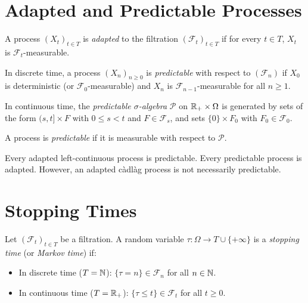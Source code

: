 \section{Adapted and Predictable Processes}

\begin{definition}
A process $(X_t)_{t \in T}$ is \emph{adapted} to the filtration
$(\mathcal{F}_t)_{t \in T}$ if for every $t \in T$, $X_t$ is
$\mathcal{F}_t$-measurable.
\end{definition}

\begin{definition}
In discrete time, a process $(X_n)_{n \geq 0}$ is \emph{predictable} with respect
to $(\mathcal{F}_n)$ if $X_0$ is deterministic (or $\mathcal{F}_0$-measurable)
and $X_n$ is $\mathcal{F}_{n-1}$-measurable for all $n \geq 1$.
\end{definition}

\begin{definition}
\label{def:predictable_sigma}
In continuous time, the \emph{predictable $\sigma$-algebra} $\mathcal{P}$ on
$\mathbb{R}_+ \times \Omega$ is generated by sets of the form $(s, t] \times F$ with
$0 \leq s < t$ and $F \in \mathcal{F}_s$, and sets $\{0\} \times F_0$ with
$F_0 \in \mathcal{F}_0$.

A process is \emph{predictable} if it is measurable with respect to $\mathcal{P}$.
\end{definition}

\begin{remark}
Every adapted left-continuous process is predictable.
Every predictable process is adapted.
However, an adapted c\`adl\`ag process is not necessarily predictable.
\end{remark}

\section{Stopping Times}

\begin{definition}
\label{def:stopping_time}
Let $(\mathcal{F}_t)_{t \in T}$ be a filtration. A random variable
$\tau : \Omega \to T \cup \{+\infty\}$ is a \emph{stopping time} (or
\emph{Markov time}) if:
\begin{itemize}
  \item In discrete time ($T = \mathbb{N}$): $\{\tau = n\} \in \mathcal{F}_n$ for all $n \in \mathbb{N}$.
  \item In continuous time ($T = \mathbb{R}_+$): $\{\tau \leq t\} \in \mathcal{F}_t$ for all $t \geq 0$.
\end{itemize}
\end{definition}

